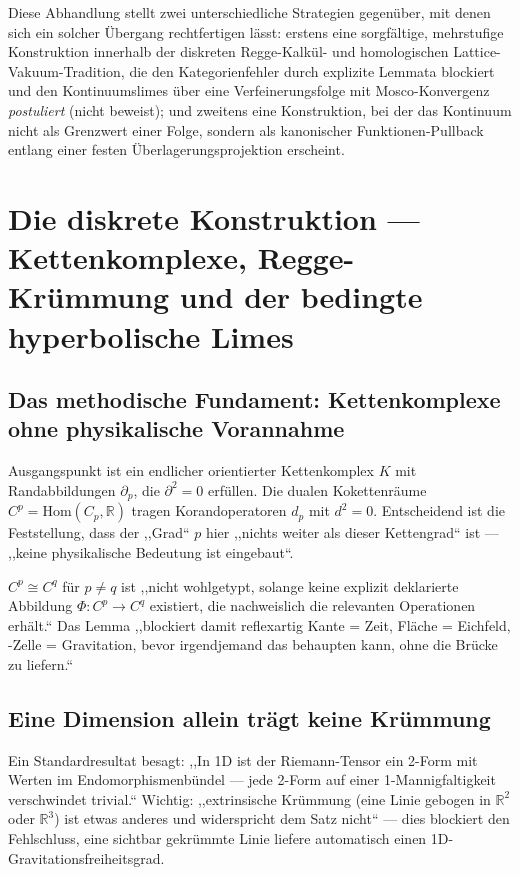 Diese Abhandlung stellt zwei unterschiedliche Strategien gegenüber, mit
denen sich ein solcher Übergang rechtfertigen lässt: erstens eine
sorgfältige, mehrstufige Konstruktion innerhalb der diskreten
Regge-Kalkül- und homologischen Lattice-Vakuum-Tradition, die den
Kategorienfehler durch explizite Lemmata blockiert und den
Kontinuumslimes über eine Verfeinerungsfolge mit Mosco-Konvergenz
\emph{postuliert} (nicht beweist); und zweitens eine Konstruktion, bei der
das Kontinuum nicht als Grenzwert einer Folge, sondern als kanonischer
Funktionen-Pullback entlang einer festen Überlagerungsprojektion
erscheint.

\section{Die diskrete Konstruktion — Kettenkomplexe, Regge-Krümmung und der bedingte hyperbolische Limes}

\subsection{Das methodische Fundament: Kettenkomplexe ohne physikalische Vorannahme}

Ausgangspunkt ist ein endlicher orientierter Kettenkomplex $K$ mit
Randabbildungen $\partial_p$, die $\partial^2=0$ erfüllen. Die dualen
Kokettenräume $C^p=\mathrm{Hom}(C_p,\mathbb{R})$ tragen Korandoperatoren
$d_p$ mit $d^2=0$. Entscheidend ist die Feststellung, dass der ,,Grad`` $p$
hier ,,nichts weiter als dieser Kettengrad`` ist — ,,keine physikalische
Bedeutung ist eingebaut``.

\begin{kernbox}[title={Kategorienfehler-Blockade}]
$C^p\cong C^q$ für $p\neq q$ ist ,,nicht wohlgetypt, solange keine explizit
deklarierte Abbildung $\Phi:C^p\to C^q$ existiert, die nachweislich die
relevanten Operationen erhält.`` Das Lemma ,,blockiert damit reflexartig
\glqq Kante = Zeit\grqq{}, \glqq Fläche = Eichfeld\grqq{}, -Zelle =
Gravitation\grqq{}, bevor irgendjemand das behaupten kann, ohne die
Brücke zu liefern.``
\end{kernbox}

\subsection{Eine Dimension allein trägt keine Krümmung}

Ein Standardresultat besagt: ,,In 1D ist der Riemann-Tensor ein 2-Form mit
Werten im Endomorphismenbündel — jede 2-Form auf einer 1-Mannigfaltigkeit
verschwindet trivial.`` Wichtig: ,,extrinsische Krümmung (eine Linie
gebogen in $\mathbb{R}^2$ oder $\mathbb{R}^3$) ist etwas anderes und
widerspricht dem Satz nicht`` — dies blockiert den Fehlschluss, eine
sichtbar gekrümmte Linie liefere automatisch einen 1D-Gravitations\-freiheitsgrad.

